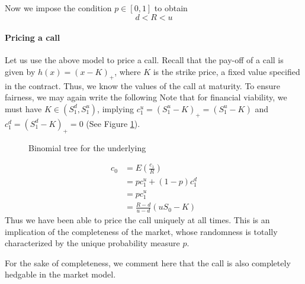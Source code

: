 Now we impose the condition $ p \in [0,1] $ to obtain
\begin{equation}
	\label{eq:crr-feasibility-condition}
	d < R < u
\end{equation}


\paragraph{Pricing a call}

Let us use the above model to price a call. Recall that the pay-off of a call is given by $ h(x) = (x - K)_+ $, where $ K $ is the strike price, a fixed value specified in the contract. Thus, we know the values of the call at maturity. To ensure fairness, we may again write the following Note that for financial viability, we must have $ K \in (S_1^d, S_1^u) $, implying $ c_1^u = (S_1^u - K)_+ = (S_1^u - K) $ and $ c_1^d = (S_1^d - K)_+ = 0 $ (See Figure \ref{fig:crr-2tr-call}).


\begin{figure}
	
	\caption{Binomial tree for the underlying}
	\label{fig:crr-2tr-call}
\end{figure}


\begin{align*}
	c_0 &= E(\frac{c_1}{R}) \\
	    &= p c_1^u + (1-p) c_1^d \\
	    &= p c_1^u \\
	    &= \frac{R - d}{u - d} (u S_0 - K)
\end{align*}
Thus we have been able to price the call uniquely at all times. This is an implication of the completeness of the market, whose randomness is totally characterized by the unique probability measure $ p $.

For the sake of completeness, we comment here that the call is also completely hedgable in the market model.







